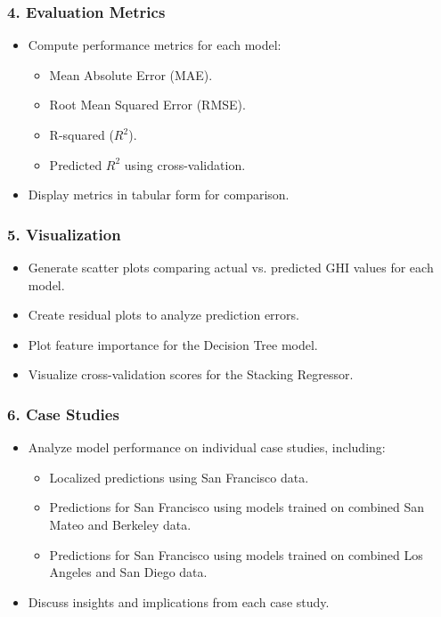 \documentclass[10pt,twocolumn]{article}
\begin{document}
\subsubsection*{4. Evaluation Metrics}
\begin{itemize}
    \item Compute performance metrics for each model:
    \begin{itemize}
        \item Mean Absolute Error (MAE).
        \item Root Mean Squared Error (RMSE).
        \item R-squared (\( R^2 \)).
        \item Predicted \( R^2 \) using cross-validation.
    \end{itemize}
    \item Display metrics in tabular form for comparison.
\end{itemize}

\subsubsection*{5. Visualization}
\begin{itemize}
    \item Generate scatter plots comparing actual vs. predicted GHI values for each model.
    \item Create residual plots to analyze prediction errors.
    \item Plot feature importance for the Decision Tree model.
    \item Visualize cross-validation scores for the Stacking Regressor.
\end{itemize}

\subsubsection*{6. Case Studies}
\begin{itemize}
    \item Analyze model performance on individual case studies, including:
    \begin{itemize}
        \item Localized predictions using San Francisco data.
        \item Predictions for San Francisco using models trained on combined San Mateo and Berkeley data.
        \item Predictions for San Francisco using models trained on combined Los Angeles and San Diego data.
    \end{itemize}
    \item Discuss insights and implications from each case study.
\end{itemize}
\end{document}
